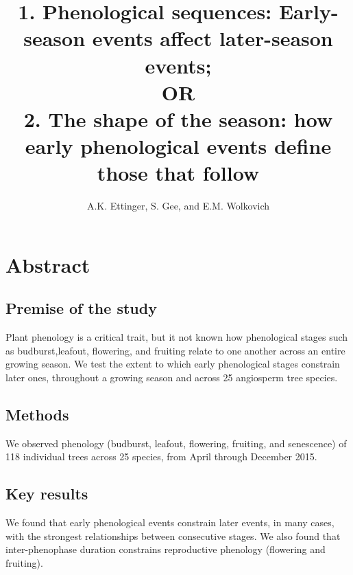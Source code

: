 \documentclass{article}
\begin{document}

\title{1. Phenological sequences: Early-season events affect later-season events; \\ OR \\
2. The shape of the season: how early phenological events define those that follow}
\author{A.K. Ettinger, S. Gee, and E.M. Wolkovich}
\maketitle  %


\section*{Abstract}
\subsection*{Premise of the study}
Plant phenology is a critical trait, but it not known how phenological stages such as budburst,leafout, flowering, and fruiting relate to one another across an entire growing season. We test the extent to which early phenological stages constrain later ones, throughout a growing season and across 25 angiosperm tree species. 
\subsection*{Methods}
We observed phenology (budburst, leafout, flowering, fruiting, and senescence) of 118 individual trees across 25 species, from April through December 2015. 
\subsection*{Key results}
We found that early phenological events constrain later events, in many cases, with the strongest relationships between consecutive stages. We also found that inter-phenophase duration constrains reproductive phenology (flowering and fruiting).
\end{document}
